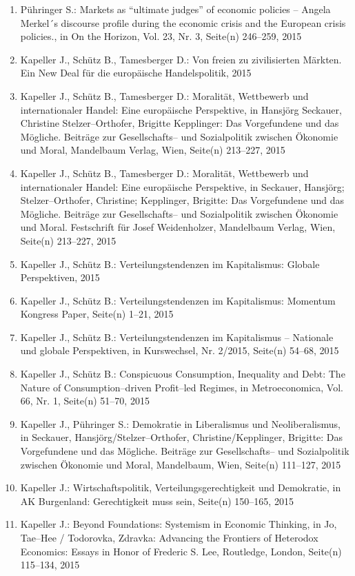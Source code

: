 \begin{enumerate}
	 \item Pühringer S.: Markets as “ultimate judges” of economic policies -- Angela Merkel´s discourse profile during the economic crisis and the European crisis policies., in On the Horizon, Vol. 23, Nr. 3, Seite(n) 246--259, 2015
	 \item Kapeller J., Schütz B., Tamesberger D.: Von freien zu zivilisierten Märkten. Ein New Deal für die europäische Handelspolitik, 2015
	 \item Kapeller J., Schütz B., Tamesberger D.: Moralität, Wettbewerb und internationaler Handel: Eine europäische Perspektive, in Hansjörg Seckauer, Christine Stelzer--Orthofer, Brigitte Kepplinger: Das Vorgefundene und das Mögliche. Beiträge zur Gesellschafts-- und Sozialpolitik zwischen Ökonomie und Moral, Mandelbaum Verlag, Wien, Seite(n) 213--227, 2015
	 \item Kapeller J., Schütz B., Tamesberger D.: Moralität, Wettbewerb und internationaler Handel: Eine europäische Perspektive, in Seckauer, Hansjörg; Stelzer--Orthofer, Christine; Kepplinger, Brigitte: Das Vorgefundene und das Mögliche. Beiträge zur Gesellschafts-- und Sozialpolitik zwischen Ökonomie und Moral. Festschrift für Josef Weidenholzer, Mandelbaum Verlag, Wien, Seite(n) 213--227, 2015
	 \item Kapeller J., Schütz B.: Verteilungstendenzen im Kapitalismus: Globale Perspektiven, 2015
	 \item Kapeller J., Schütz B.: Verteilungstendenzen im Kapitalismus: Momentum Kongress Paper, Seite(n) 1--21, 2015
	 \item Kapeller J., Schütz B.: Verteilungstendenzen im Kapitalismus -- Nationale und globale Perspektiven, in Kurswechsel, Nr. 2/2015, Seite(n) 54--68, 2015
	 \item Kapeller J., Schütz B.: Conspicuous Consumption, Inequality and Debt: The Nature of Consumption--driven Profit--led Regimes, in Metroeconomica, Vol. 66, Nr. 1, Seite(n) 51--70, 2015
	 \item Kapeller J., Pühringer S.: Demokratie in Liberalismus und Neoliberalismus, in Seckauer, Hansjörg/Stelzer--Orthofer, Christine/Kepplinger, Brigitte: Das Vorgefundene und das Mögliche. Beiträge zur Gesellschafts-- und Sozialpolitik zwischen Ökonomie und Moral, Mandelbaum, Wien, Seite(n) 111--127, 2015
	 \item Kapeller J.: Wirtschaftspolitik, Verteilungsgerechtigkeit und Demokratie, in AK Burgenland: Gerechtigkeit muss sein, Seite(n) 150--165, 2015
	 \item Kapeller J.: Beyond Foundations: Systemism in Economic  Thinking, in Jo, Tae--Hee / Todorovka, Zdravka: Advancing the Frontiers of Heterodox Economics: Essays in Honor of Frederic S. Lee, Routledge, London, Seite(n) 115--134, 2015

\end{enumerate}
